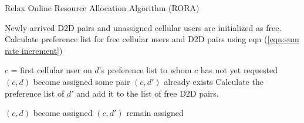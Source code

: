 \documentclass[times]{dacauth}
\begin{document}
\par
 \begin{algorithm}	
   \caption{Relax Online Resource Allocation Algorithm (RORA) }
   \label{algorthm2}
    \begin{algorithmic}[1]

       \State Newly arrived D2D pairs and unassigned cellular users are initialized as free.  
        \State Calculate preference list for free cellular users and D2D pairs using eqn (\ref{eqn:sum rate increment})
			
		
			\State $c$ = first cellular user on $d$'s preference list to whom $c$ has not yet requested
				\State $(c,d)$ become assigned
			\Else
				\State some pair $(c, d')$ already exists
					\State Calculate the preference list of $d'$ and add it to the list of free D2D pairs. 
                                               
					\State $(c, d)$ become assigned
				\Else
					\State $(c, d')$ remain assigned
				\EndIf
			\EndIf
		\EndWhile      	
	\EndProcedure

\end{algorithmic}
\end{algorithm}
\end{document}
